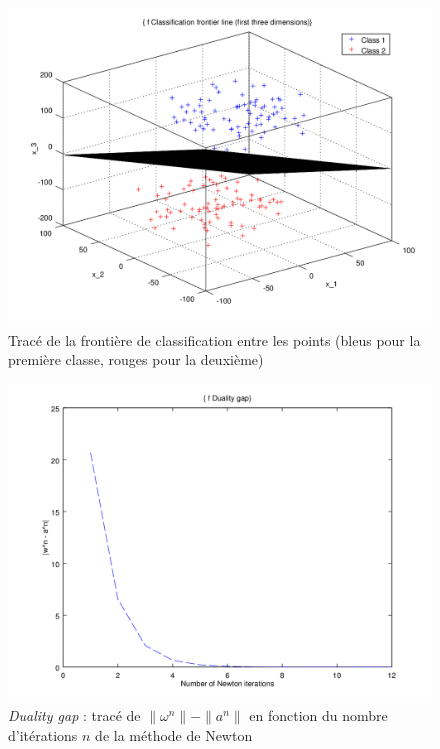 \documentclass{article}
\begin{document}
         \begin{figure}
           \begin{center}
             \subfigure\includegraphics[scale=0.5]{images/plane2.png}
             \caption{Tracé de la frontière de classification entre les points (bleus pour la première classe, rouges pour la deuxième)}
           \end{center}
         \end{figure}

         \begin{figure}
           \begin{center}
             \subfigure\includegraphics[scale=0.5]{images/duality2.png}
             \caption{\emph{Duality gap} : tracé de $\|\omega^n\| - \|a^n\|$ en fonction du nombre d'itérations $n$ de la méthode de Newton}
           \end{center}
         \end{figure}
\end{document}
